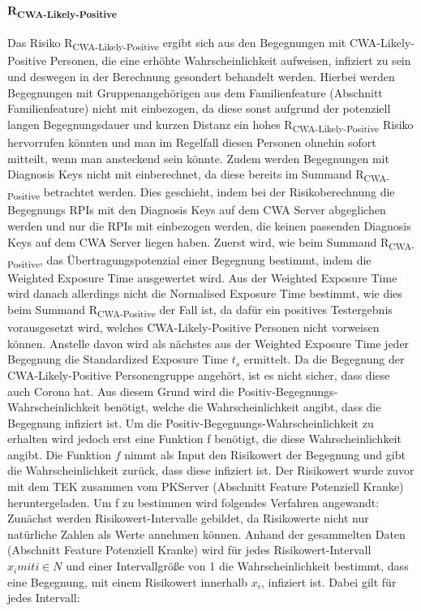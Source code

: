 \documentclass[conference]{IEEEtran}
\begin{document}
\paragraph{R\textsubscript{CWA-Likely-Positive}}
Das Risiko R\textsubscript{CWA-Likely-Positive} ergibt sich aus den Begegnungen mit CWA-Likely-Positive Personen, 
die eine erhöhte Wahrscheinlichkeit aufweisen, infiziert zu sein und deswegen in der Berechnung gesondert behandelt werden. 
Hierbei werden Begegnungen mit Gruppenangehörigen aus dem Familienfeature (Abschnitt Familienfeature) nicht mit einbezogen, 
da diese sonst aufgrund der potenziell langen Begegnungsdauer und 
kurzen Distanz ein hohes R\textsubscript{CWA-Likely-Positive} Risiko hervorrufen könnten und man im Regelfall diesen Personen ohnehin sofort mitteilt, wenn man ansteckend sein könnte. 
Zudem werden Begegnungen mit Diagnosis Keys nicht mit einberechnet, da diese bereits im Summand R\textsubscript{CWA-Positive} betrachtet werden. Dies geschieht, 
indem bei der Risikoberechnung die Begegnungs RPIs mit den Diagnosis Keys auf dem CWA Server abgeglichen werden und nur die RPIs mit einbezogen werden, 
die keinen passenden Diagnosis Keys auf dem CWA Server liegen haben.
Zuerst wird, wie beim Summand R\textsubscript{CWA-Positive}, das Übertragungspotenzial einer Begegnung bestimmt, indem die Weighted Exposure Time ausgewertet wird. 
Aus der Weighted Exposure Time wird danach allerdings nicht die Normalised Exposure Time bestimmt, wie dies beim Summand R\textsubscript{CWA-Positive} der Fall ist, 
da dafür ein positives Testergebnis vorausgesetzt wird, welches CWA-Likely-Positive Personen nicht vorweisen können.
Anstelle davon wird als nächstes aus der Weighted Exposure Time jeder Begegnung die Standardized Exposure Time $t_s$ ermittelt. 
Da die Begegnung der CWA-Likely-Positive Personengruppe angehört, ist es nicht sicher, dass diese auch Corona hat. 
Aus diesem Grund wird die Positiv-Begegnungs-Wahrscheinlichkeit benötigt, welche die Wahrscheinlichkeit angibt, dass die Begegnung infiziert ist. 
Um die Positiv-Begegnungs-Wahrscheinlichkeit zu erhalten wird jedoch erst eine Funktion f benötigt, die diese Wahrscheinlichkeit angibt. 
Die Funktion $f$ nimmt als Input den Risikowert der Begegnung und gibt die Wahrscheinlichkeit zurück, dass diese infiziert ist. 
Der Risikowert wurde zuvor mit dem TEK zusammen vom PKServer (Abschnitt Feature Potenziell Kranke) heruntergeladen. Um f zu bestimmen wird folgendes Verfahren angewandt:
Zunächst werden Risikowert-Intervalle gebildet, da Risikowerte nicht nur natürliche Zahlen als Werte annehmen können. 
Anhand der gesammelten Daten (Abschnitt Feature Potenziell Kranke) wird für jedes Risikowert-Intervall $x_i mit i \in N$ und einer Intervallgröße von 1 die Wahrscheinlichkeit bestimmt, 
dass eine Begegnung, mit einem Risikowert innerhalb $x_i$, infiziert ist. Dabei gilt für jedes Intervall:
\end{document}
